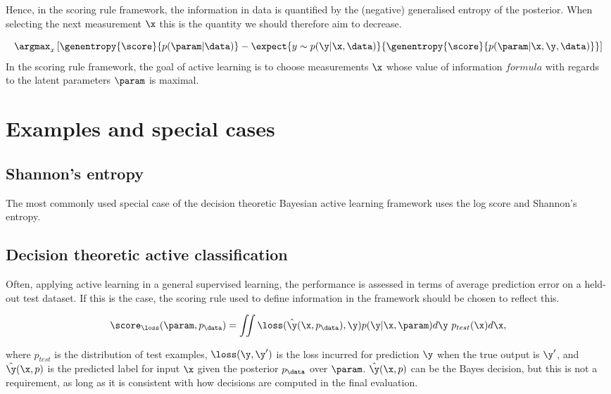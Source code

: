 Hence, in the scoring rule framework, the information in data is quantified by the (negative) generalised entropy of the posterior. When selecting the next measurement $\x$ this is the quantity we should therefore aim to decrease.

\begin{equation}
\argmax_x \left[ \genentropy{\score}{p(\param\vert\data)} - \expect{y\sim p(\y\vert \x, \data)}{\genentropy{\score}{p(\param\vert \x,\y,\data)} }\right ]
\end{equation}
In the scoring rule framework, the goal of active learning is to choose measurements $\x$ whose value of information $formula$ with regards to the latent parameters $\param$ is maximal.

\section{Examples and special cases}
\subsection{Shannon's entropy}

The most commonly used special case of the decision theoretic Bayesian active learning framework uses the log score and Shannon's entropy. 

\citep{MacKay,BALD}

\subsection{Decision theoretic active classification}

Often, applying active learning in a general supervised learning, the performance is assessed in terms of average prediction error on a held-out test dataset. If this is the case, the scoring rule used to define information in the framework should be chosen to reflect this.

\begin{equation}
	\score_{\loss}(\param,p_\data) = \iint \loss(\hat{\y}(\x,p_\data),\y) p(\y\vert\x,\param) d\y\ p_{test}(\x) d\x,
\end{equation}

where $p_{test}$ is the distribution of test examples, $\loss(\y,\y')$ is the loss incurred for prediction $\y$ when the true output is $\y'$, and $\hat{\y}(\x,p)$ is the predicted label for input $\x$ given the posterior $p_\data$ over $\param$. $\hat{\y}(\x,p)$ can be the Bayes decision, but this is not a requirement, as long as it is consistent with how decisions are computed in the final evaluation.

